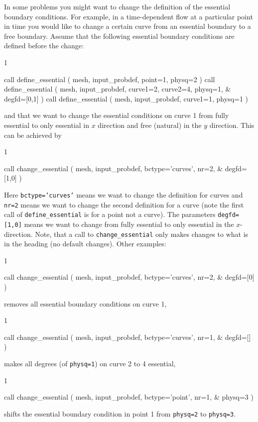 In some problems you might want to change
the definition of the essential boundary
conditions. For example, in a time-dependent flow at a particular point in time
you would like to change a certain curve from an essential boundary to a
free boundary. Assume that the following essential boundary conditions are
defined before the change:
\begin{listing}{1}

  call define_essential ( mesh, input_probdef, point=1, physq=2 )
  call define_essential ( mesh, input_probdef, curve1=2, curve2=4, physq=1, &
    degfd=[0,1] )
  call define_essential ( mesh, input_probdef, curve1=1, physq=1 )

\end{listing}
and that we want to change the essential conditions on curve 1 from fully
essential to only essential in $x$ direction and free (natural) in the $y$
direction. This can be achieved by
\begin{listing}{1}
   
  call change_essential ( mesh, input_probdef, bctype='curves', nr=2, &
    degfd=[1,0] )

\end{listing}
Here \texttt{bctype='curves'} means we want to change the definition for
curves and \texttt{nr=2} means we want to change the second definition
for a curve (note
the first call of \texttt{define\_essential} is for a point not a curve).
The parameters \texttt{degfd=[1,0]} means we want to change from fully
essential to only essential in the $x$-direction.
Note, that a call to \texttt{change\_essential} only makes changes to what is
in the heading (no default changes).
Other examples:
\begin{listing}{1}
   
  call change_essential ( mesh, input_probdef, bctype='curves', nr=2, &
    degfd=[0] )

\end{listing}
removes all essential boundary conditions on curve 1,
\begin{listing}{1}
   
  call change_essential ( mesh, input_probdef, bctype='curves', nr=1, &
    degfd=[] )

\end{listing}
makes all degrees (of \texttt{physq=1}) on curve 2 to 4 essential,
\begin{listing}{1}
   
  call change_essential ( mesh, input_probdef, bctype='point', nr=1, &
    physq=3 )

\end{listing}
shifts the essential boundary condition in point 1 from \texttt{physq=2} to
\texttt{physq=3}.

